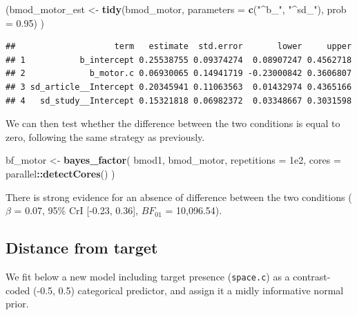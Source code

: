 \documentclass[floatsintext,doc]{apa6}
\newenvironment{Shaded}{\begin{snugshade}}{\end{snugshade}}
\newcommand{\DataTypeTok}[1]{\textcolor[rgb]{0.13,0.29,0.53}{#1}}
\newcommand{\FloatTok}[1]{\textcolor[rgb]{0.00,0.00,0.81}{#1}}
\newcommand{\KeywordTok}[1]{\textcolor[rgb]{0.13,0.29,0.53}{\textbf{#1}}}
\newcommand{\NormalTok}[1]{#1}
\newcommand{\OperatorTok}[1]{\textcolor[rgb]{0.81,0.36,0.00}{\textbf{#1}}}
\newcommand{\StringTok}[1]{\textcolor[rgb]{0.31,0.60,0.02}{#1}}
\begin{document}
\begin{Shaded}
\begin{Highlighting}[]
\NormalTok{(bmod_motor_est <-}\StringTok{ }\KeywordTok{tidy}\NormalTok{(bmod_motor, }\DataTypeTok{parameters =} \KeywordTok{c}\NormalTok{(}\StringTok{"^b_"}\NormalTok{, }\StringTok{"^sd_"}\NormalTok{), }\DataTypeTok{prob =} \FloatTok{0.95}\NormalTok{) )}
\end{Highlighting}
\end{Shaded}

\begin{verbatim}
##                    term   estimate  std.error       lower     upper
## 1           b_intercept 0.25538755 0.09374274  0.08907247 0.4562718
## 2             b_motor.c 0.06930065 0.14941719 -0.23000842 0.3606807
## 3 sd_article__Intercept 0.20345941 0.11063563  0.01432974 0.4365166
## 4   sd_study__Intercept 0.15321818 0.06982372  0.03348667 0.3031598
\end{verbatim}

We can then test whether the difference between the two conditions is equal to zero, following the same strategy as previously.

\begin{Shaded}
\begin{Highlighting}[]
\NormalTok{bf_motor <-}\StringTok{ }\KeywordTok{bayes_factor}\NormalTok{(}
\NormalTok{    bmod1, bmod_motor,}
    \DataTypeTok{repetitions =} \FloatTok{1e2}\NormalTok{, }\DataTypeTok{cores =}\NormalTok{ parallel}\OperatorTok{::}\KeywordTok{detectCores}\NormalTok{()}
\NormalTok{    )}
\end{Highlighting}
\end{Shaded}

There is strong evidence for an absence of difference between the two conditions (\(\beta\) = 0.07, 95\% CrI {[}-0.23, 0.36{]}, \(BF_{01}\) = 10,096.54).

\hypertarget{distance-from-target}{%
\subsection{Distance from target}\label{distance-from-target}}

We fit below a new model including target presence (\texttt{space.c}) as a contrast-coded (-0.5, 0.5) categorical predictor, and assign it a midly informative normal prior.
\end{document}
